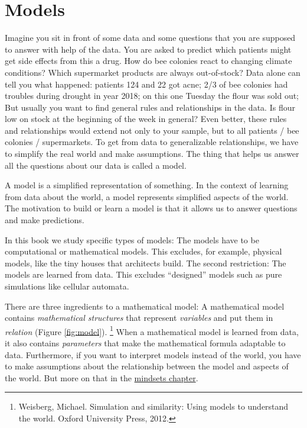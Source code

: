 \documentclass[
  10pt,
]{scrbook}
\begin{document}
\mainmatter

\hypertarget{models}{%
\chapter{Models}\label{models}}

Imagine you sit in front of some data and some questions that you are supposed to answer with help of the data.
You are asked to predict which patients might get side effects from this a drug.
How do bee colonies react to changing climate conditions?
Which supermarket products are always out-of-stock?
Data alone can tell you what happened: patients 124 and 22 got acne; 2/3 of bee colonies had troubles during drought in year 2018; on this one Tuesday the flour was sold out;
But usually you want to find general rules and relationships in the data.
Is flour low on stock at the beginning of the week in general?
Even better, these rules and relationships would extend not only to your sample, but to all patients / bee colonies / supermarkets.
To get from data to generalizable relationships, we have to simplify the real world and make assumptions.
The thing that helps us answer all the questions about our data is called a model.

A model is a simplified representation of something.
In the context of learning from data about the world, a model represents simplified aspects of the world.
The motivation to build or learn a model is that it allows us to answer questions and make predictions.

In this book we study specific types of models:
The models have to be computational or mathematical models.
This excludes, for example, physical models, like the tiny houses that architects build.
The second restriction: The models are learned from data.
This excludes ``designed'' models such as pure simulations like cellular automata.

There are three ingredients to a mathematical model:
A mathematical model contains \emph{mathematical structures} that represent \emph{variables} and put them in \emph{relation} (Figure \ref{fig:model}). \footnote{Weisberg, Michael. Simulation and similarity: Using models to understand the world. Oxford University Press, 2012.}
When a mathematical model is learned from data, it also contains \emph{parameters} that make the mathematical formula adaptable to data.
Furthermore, if you want to interpret models instead of the world, you have to make assumptions about the relationship between the model and aspects of the world.
But more on that in the \protect\hyperlink{mindsets}{mindsets chapter}.
\end{document}
